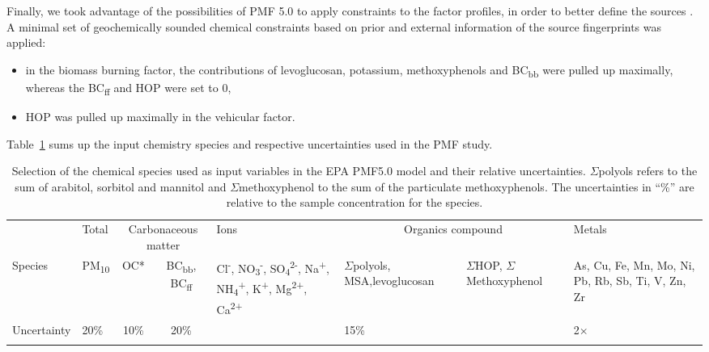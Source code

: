 \documentclass[acp, manuscript]{copernicus}
\begin{document}
Finally, we took advantage of the possibilities of PMF 5.0 to apply
constraints to the factor profiles, in order to better define the sources
\citep{golly_etude_2014,srivastava_speciation_2017,salameh_impacts_2015}. A minimal set
of geochemically sounded chemical constraints based on prior and external
information of the source fingerprints was applied:
\begin{itemize}
    \item
        in the biomass burning factor, the contributions of levoglucosan, potassium,
        methoxyphenols and BC\textsubscript{bb} were pulled up maximally,
        whereas the BC\textsubscript{ff} and HOP were set to 0,
    \item
        HOP was pulled up maximally in the vehicular factor.
\end{itemize}

Table~\ref{tab:PMFentry} sums up the input chemistry species and respective uncertainties
used in the PMF study.
\begin{table}
    \centering
    \caption{Selection of the chemical species used as input variables in the EPA PMF5.0
        model and their relative uncertainties. $\Sigma$polyols refers to the sum of
        arabitol, sorbitol and mannitol and $\Sigma$methoxyphenol to the sum of the
        particulate methoxyphenols.  The uncertainties in ``\%'' are relative to
        the sample concentration for the species.}
    \begin{tabularx}{\textwidth}{Xlccm{2.7cm}m{1.5cm}m{2.6cm}m{3cm}}
        \tophline
        & Total & \multicolumn{2}{c}{Carbonaceous matter} & Ions &
        \multicolumn{2}{c}{Organics compound} & Metals\\
        \middlehline
        Species & PM\textsubscript{10} & OC* &
        BC\textsubscript{bb}, BC\textsubscript{ff} & Cl\textsuperscript{-},
        NO\textsubscript{3}\textsuperscript{-},
        SO\textsubscript{4}\textsuperscript{2-}, Na\textsuperscript{+},
        NH\textsubscript{4}\textsuperscript{+}, K\textsuperscript{+},
        Mg\textsuperscript{2+}, Ca\textsuperscript{2+} &
        $\Sigma$polyols, MSA,\newline levoglucosan &
        $\Sigma$HOP, $\Sigma$Methoxyphenol &
        As, Cu, Fe, Mn, Mo, Ni, Pb, Rb, Sb, Ti, V, Zn, Zr
        \\
        Uncertainty & 20\% & 10\% & 20\% & \citet{gianini_source_2013} &
        15\% & \citet{gianini_source_2013} & 2$\times$\citet{gianini_source_2013} \tabularnewline
        \bottomhline
    \end{tabularx}
    \label{tab:PMFentry}
\end{table}
\end{document}
